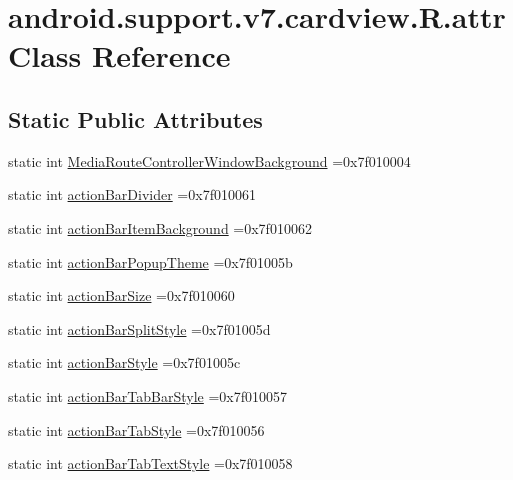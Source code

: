 \hypertarget{classandroid_1_1support_1_1v7_1_1cardview_1_1R_1_1attr}{}\section{android.\+support.\+v7.\+cardview.\+R.\+attr Class Reference}
\label{classandroid_1_1support_1_1v7_1_1cardview_1_1R_1_1attr}
\subsection*{Static Public Attributes}
\begin{DoxyCompactItemize}
\item 
static int \hyperlink{classandroid_1_1support_1_1v7_1_1cardview_1_1R_1_1attr_abe7ef963fa013a0185f9c3515bec1596}{Media\+Route\+Controller\+Window\+Background} =0x7f010004
\item 
static int \hyperlink{classandroid_1_1support_1_1v7_1_1cardview_1_1R_1_1attr_a46540c31785eb38b5f429ff0d328db89}{action\+Bar\+Divider} =0x7f010061
\item 
static int \hyperlink{classandroid_1_1support_1_1v7_1_1cardview_1_1R_1_1attr_ae4a87147b65e560b5f3446acbd9a8ad7}{action\+Bar\+Item\+Background} =0x7f010062
\item 
static int \hyperlink{classandroid_1_1support_1_1v7_1_1cardview_1_1R_1_1attr_a70ff332804ed3c7f1cc950f6cf913588}{action\+Bar\+Popup\+Theme} =0x7f01005b
\item 
static int \hyperlink{classandroid_1_1support_1_1v7_1_1cardview_1_1R_1_1attr_ac3e9990e1d340ee3e2e2fa35174e2f4b}{action\+Bar\+Size} =0x7f010060
\item 
static int \hyperlink{classandroid_1_1support_1_1v7_1_1cardview_1_1R_1_1attr_aad15ddf6cf457cf83708b86466ad7f8d}{action\+Bar\+Split\+Style} =0x7f01005d
\item 
static int \hyperlink{classandroid_1_1support_1_1v7_1_1cardview_1_1R_1_1attr_a0a184a5026bb06941c05d30ef94a8c6c}{action\+Bar\+Style} =0x7f01005c
\item 
static int \hyperlink{classandroid_1_1support_1_1v7_1_1cardview_1_1R_1_1attr_a6cec976666d0511a7c3d1e69ca2343e7}{action\+Bar\+Tab\+Bar\+Style} =0x7f010057
\item 
static int \hyperlink{classandroid_1_1support_1_1v7_1_1cardview_1_1R_1_1attr_abb2876dd6a1fbbb1ffa524f17eb9cf2c}{action\+Bar\+Tab\+Style} =0x7f010056
\item 
static int \hyperlink{classandroid_1_1support_1_1v7_1_1cardview_1_1R_1_1attr_a735d229e3a8a41c55787e41d7db51a85}{action\+Bar\+Tab\+Text\+Style} =0x7f010058

\end{DoxyCompactItemize}

